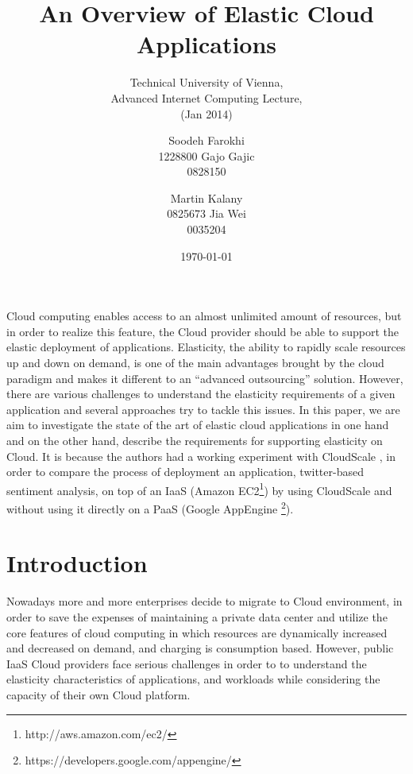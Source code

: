 \documentclass{sig-alternate}
\begin{document}
\title{An Overview of Elastic Cloud Applications}
\subtitle{Technical University of Vienna,\\Advanced Internet Computing Lecture,\\
(Jan 2014)}


\author{
\alignauthor
Soodeh Farokhi\\ %
       1228800
\alignauthor
Gajo Gajic\\
       0828150
\and
\alignauthor
Martin Kalany\\
       0825673
\alignauthor
Jia Wei\\
       0035204
}
       
\date{\today}

\maketitle
\begin{abstract}
\end{abstract}
\noindent
Cloud computing enables access to an almost unlimited amount of resources, but in order to realize this feature, the Cloud provider should be able to support the elastic deployment of applications. Elasticity, the ability to rapidly scale resources up and down on demand, is one of the main advantages brought by the cloud paradigm and makes it different to an “advanced outsourcing” solution.
However, there are various challenges to understand the elasticity requirements of a given application and  several approaches try to tackle this issues. In this paper, we are aim to investigate the state of the art of elastic cloud applications in one hand and on the other hand, describe the requirements for supporting elasticity on Cloud. 
It is because the authors had a working experiment with CloudScale \cite{leitner2012cloudscale}, \cite{Leitner2013} in order to compare the process of deployment an application, twitter-based sentiment analysis, on top of an IaaS (Amazon EC2\footnote{http://aws.amazon.com/ec2/}) by using CloudScale and without using it directly on a PaaS (Google AppEngine \footnote{https://developers.google.com/appengine/}).


\section{Introduction}
\noindent
Nowadays more and more enterprises decide to migrate to Cloud environment, in order to save the expenses of maintaining a private data center and utilize the core features of cloud computing in which resources are dynamically increased and decreased on demand, and charging is consumption based. However, public IaaS Cloud providers face serious challenges in order to to understand the elasticity characteristics of applications, and workloads while considering the capacity of their own Cloud platform. 
\end{document}
